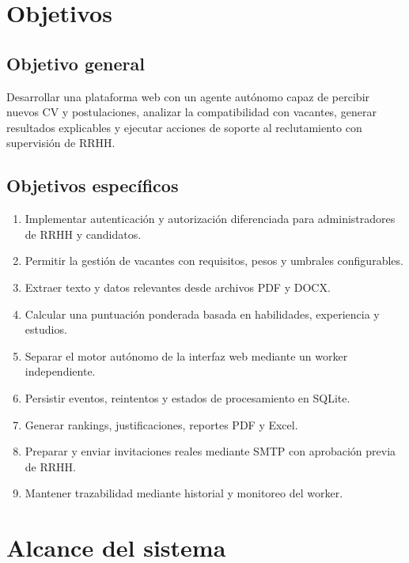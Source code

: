 \documentclass[12pt,a4paper]{article}
\begin{document}
\section{Objetivos}

\subsection{Objetivo general}

Desarrollar una plataforma web con un agente autónomo capaz de percibir nuevos CV y postulaciones, analizar la compatibilidad con vacantes, generar resultados explicables y ejecutar acciones de soporte al reclutamiento con supervisión de RRHH.

\subsection{Objetivos específicos}

\begin{enumerate}[leftmargin=*]
    \item Implementar autenticación y autorización diferenciada para administradores de RRHH y candidatos.
    \item Permitir la gestión de vacantes con requisitos, pesos y umbrales configurables.
    \item Extraer texto y datos relevantes desde archivos PDF y DOCX.
    \item Calcular una puntuación ponderada basada en habilidades, experiencia y estudios.
    \item Separar el motor autónomo de la interfaz web mediante un worker independiente.
    \item Persistir eventos, reintentos y estados de procesamiento en SQLite.
    \item Generar rankings, justificaciones, reportes PDF y Excel.
    \item Preparar y enviar invitaciones reales mediante SMTP con aprobación previa de RRHH.
    \item Mantener trazabilidad mediante historial y monitoreo del worker.
\end{enumerate}

\section{Alcance del sistema}
\end{document}
